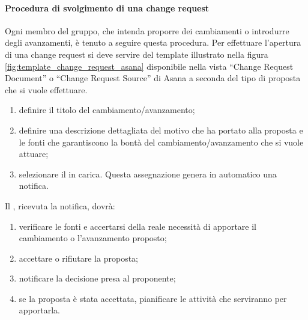 			\paragraph{Procedura di svolgimento di una change request} %
			\label{par:procedura_di_svolgimento_di_una_change_request}
			Ogni membro del gruppo, che intenda proporre dei cambiamenti o introdurre degli avanzamenti, è tenuto a seguire questa procedura. \newline
			Per effettuare l'apertura di una change request si deve servire del template illustrato nella figura \ref{fig:template_change_request_asana} disponibile nella vista ``Change Request Document'' o ``Change Request Source'' di Asana a seconda del tipo di proposta che si vuole effettuare.
				\begin{enumerate}
					\item definire il titolo del cambiamento/avanzamento;
					\item definire una descrizione dettagliata del motivo che ha portato alla proposta e le fonti che garantiscono la bontà del cambiamento/avanzamento che si vuole attuare;
					\item selezionare il \roleProjectManager{} in carica. Questa assegnazione genera in automatico una notifica.
				\end{enumerate}
			\noindent
			Il \roleProjectManager{}, ricevuta la notifica, dovrà:
			 	\begin{enumerate}
			 		\item verificare le fonti e accertarsi della reale necessità di apportare il cambiamento o l'avanzamento proposto;
			 		\item accettare o rifiutare la proposta;
					\item notificare la decisione presa al proponente;
					\item se la proposta è stata accettata, pianificare le attività che serviranno per apportarla.
			 	\end{enumerate}

